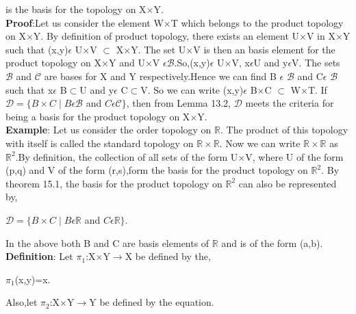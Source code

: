 \documentclass[a4paper,english,12pt]{article}
\begin{document}
\begin{flushleft}
\begin{center}
\end{center}
\vspace{1mm}
is the basis for the topology on X$\times$Y.\\
{\bf Proof}:Let us consider the element W$\times$T which belongs to the product topology on X$\times$Y. By definition of product topology, there exists an element U$\times$V in X$\times$Y such that (x,y)$\epsilon$ U$\times$V $\subset$ X$\times$Y. The set U$\times$V is then an basis element for the product topology on X$\times$Y and U$\times$V $\epsilon \mathscr{B}$.So,(x,y)$\epsilon$ U$\times$V, x$\epsilon$U and y$\epsilon$V. The sets $\mathscr{B}$ and $\mathscr{C}$ are bases for X and Y respectively.Hence we can find B $\epsilon$ $\mathscr{B}$ and C$\epsilon$ $\mathscr{B}$ such that x$\epsilon$ B$\subset$U and y$\epsilon$ C$\subset$V. So we can write (x,y)$\epsilon$ B$\times$C $\subset$ W$\times$T. If $\mathscr{D}=\{B\times C\mid B \epsilon \mathscr{B}$ and $C \epsilon \mathscr{C}\}$, then from Lemma 13.2, $\mathscr{D}$ meets the criteria for being a basis for the product topology on X$\times$Y.\\
\vspace{1mm}
{\bf Example}: Let us consider the order topology on $\mathbb{R}$. The product of this topology with itself is called the standard topology on $\mathbb{R}\times\mathbb{R}$. Now we can write $\mathbb{R}\times\mathbb{R}$ as $\mathbb{R}^2$.By definition, the collection of all sets of the form U$\times$V, where U  of the form (p,q) and V of the form (r,s),form the basis for the product topology on $\mathbb{R}^2$. By theorem 15.1, the basis for the product topology on $\mathbb{R}^2$ can also be represented by,\\
\begin{center}
$\mathscr{D}=\{B\times C\mid B \epsilon \mathbb{R}$ and $C \epsilon \mathbb{R}\}$.\\
\end{center}
In the above  both B and C are basis elements of $\mathbb{R}$ and is of the form (a,b).\\
\vspace{1mm}
{\bf Definition}: Let $\pi_1$:X$\times$Y$\rightarrow$X be defined by the,\\
\begin{center}
$\pi_1$(x,y)=x. \\
\end{center}
Also,let $\pi_2$:X$\times$Y$\rightarrow$Y be defined by the equation.\\
\begin{center}

\end{center}
\end{flushleft}
\end{document}
